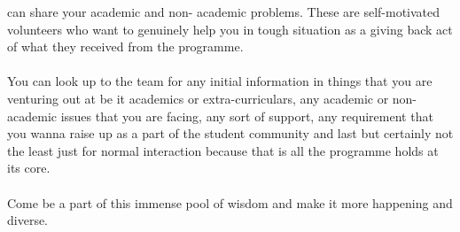 \documentclass[openany]{book} %
\begin{document}
can share your academic and non- academic problems. These are self-motivated volunteers who want to
genuinely help you in tough situation as a giving back act of what they received from the programme.\\  
\\ You can look up to the team for any initial information in things that you are venturing out at be it academics or extra-curriculars, any academic or non- academic issues that you are facing, any sort of support, any requirement that you wanna raise up as a part of the student community and last but certainly not the least just for normal interaction because that is all the programme holds at its core.\\
\\
Come be a part of this immense pool of wisdom and make it more happening and diverse. \\
\end{document}
